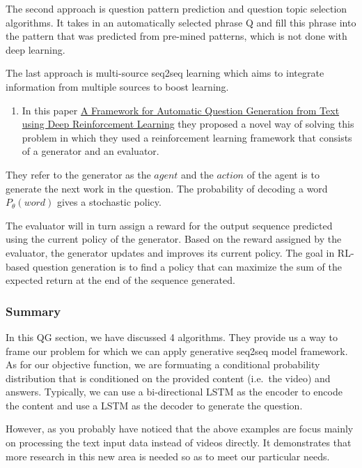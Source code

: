 \documentclass[]{book}
\providecommand{\tightlist}{%
  \setlength{\itemsep}{0pt}\setlength{\parskip}{0pt}}
\theoremstyle{definition}
\theoremstyle{definition}
\theoremstyle{definition}
\theoremstyle{remark}
\begin{document}
The second approach is question pattern prediction and question topic
selection algorithms. It takes in an automatically selected phrase Q and
fill this phrase into the pattern that was predicted from pre-mined
patterns, which is not done with deep learning.

The last approach is multi-source seq2seq learning which aims to
integrate information from multiple sources to boost learning.

\begin{enumerate}
\def\labelenumi{\arabic{enumi}.}
\setcounter{enumi}{3}
\tightlist
\item
  In this paper \href{https://arxiv.org/pdf/1808.04961.pdf}{A Framework
  for Automatic Question Generation from Text using Deep Reinforcement
  Learning} they proposed a novel way of solving this problem in which
  they used a reinforcement learning framework that consists of a
  generator and an evaluator.
\end{enumerate}

They refer to the generator as the \(agent\) and the \(action\) of the
agent is to generate the next work in the question. The probability of
decoding a word \(P_{\theta}(word)\) gives a stochastic policy.

The evaluator will in turn assign a reward for the output sequence
predicted using the current policy of the generator. Based on the reward
assigned by the evaluator, the generator updates and improves its
current policy. The goal in RL-based question generation is to find a
policy that can maximize the sum of the expected return at the end of
the sequence generated.

\subsubsection{Summary}\label{summary}

In this QG section, we have discussed 4 algorithms. They provide us a
way to frame our problem for which we can apply generative seq2seq model
framework. As for our objective function, we are formuating a
conditional probability distribution that is conditioned on the provided
content (i.e.~the video) and answers. Typically, we can use a
bi-directional LSTM as the encoder to encode the content and use a LSTM
as the decoder to generate the question.

However, as you probably have noticed that the above examples are focus
mainly on processing the text input data instead of videos directly. It
demonstrates that more research in this new area is needed so as to meet
our particular needs.
\end{document}
